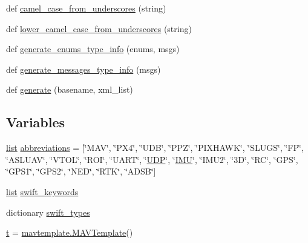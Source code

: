 \begin{DoxyCompactItemize}
\item 
def \mbox{\hyperlink{namespacepymavlink_1_1generator_1_1mavgen__swift_a3be145e5779805512d208e0a874649f5}{camel\+\_\+case\+\_\+from\+\_\+underscores}} (string)
\item 
def \mbox{\hyperlink{namespacepymavlink_1_1generator_1_1mavgen__swift_a760d6a0be86d0a7a913f3294776c9032}{lower\+\_\+camel\+\_\+case\+\_\+from\+\_\+underscores}} (string)
\item 
def \mbox{\hyperlink{namespacepymavlink_1_1generator_1_1mavgen__swift_afb69b33604ef3c1f420f5765fba3a6f3}{generate\+\_\+enums\+\_\+type\+\_\+info}} (enums, msgs)
\item 
def \mbox{\hyperlink{namespacepymavlink_1_1generator_1_1mavgen__swift_ab22d92a382854b7dfe92145f9efc184a}{generate\+\_\+messages\+\_\+type\+\_\+info}} (msgs)
\item 
def \mbox{\hyperlink{namespacepymavlink_1_1generator_1_1mavgen__swift_a0435c038175b5fff7394838ccebd9c64}{generate}} (basename, xml\+\_\+list)
\end{DoxyCompactItemize}
\subsection*{Variables}
\begin{DoxyCompactItemize}
\item 
\mbox{\hyperlink{structlist}{list}} \mbox{\hyperlink{namespacepymavlink_1_1generator_1_1mavgen__swift_a7d48550252b4b1e2355d537407feb187}{abbreviations}} = \mbox{[}\char`\"{}M\+AV\char`\"{}, \char`\"{}P\+X4\char`\"{}, \char`\"{}U\+DB\char`\"{}, \char`\"{}P\+PZ\char`\"{}, \char`\"{}P\+I\+X\+H\+A\+WK\char`\"{}, \char`\"{}S\+L\+U\+GS\char`\"{}, \char`\"{}FP\char`\"{}, \char`\"{}A\+S\+L\+U\+AV\char`\"{}, \char`\"{}V\+T\+OL\char`\"{}, \char`\"{}R\+OI\char`\"{}, \char`\"{}U\+A\+RT\char`\"{}, \char`\"{}\mbox{\hyperlink{classUDP}{U\+DP}}\char`\"{}, \char`\"{}\mbox{\hyperlink{side__camera__transform_8cpp_af4c1686b93c23e8b4b698c82c66845f4}{I\+MU}}\char`\"{}, \char`\"{}I\+M\+U2\char`\"{}, \char`\"{}3\+D\char`\"{}, \char`\"{}\+R\+C\char`\"{}, \char`\"{}\+G\+P\+S\char`\"{}, \char`\"{}\+G\+P\+S1\char`\"{}, \char`\"{}\+G\+P\+S2\char`\"{}, \char`\"{}\+N\+E\+D\char`\"{}, \char`\"{}\+R\+T\+K\char`\"{}, \char`\"{}\+A\+D\+S\+B\char`\"{}\mbox{]}
\item 
\mbox{\hyperlink{structlist}{list}} \mbox{\hyperlink{namespacepymavlink_1_1generator_1_1mavgen__swift_a0de31e1282edfda1429e7a1c9a3412fd}{swift\+\_\+keywords}}
\item 
dictionary \mbox{\hyperlink{namespacepymavlink_1_1generator_1_1mavgen__swift_aacf38ae82237859e3f36b253a9af5a6a}{swift\+\_\+types}}
\item 
\mbox{\hyperlink{namespacepymavlink_1_1generator_1_1mavgen__swift_aac7fb2c7851d03726e4b15fd2304711d}{t}} = \mbox{\hyperlink{classpymavlink_1_1generator_1_1mavtemplate_1_1MAVTemplate}{mavtemplate.\+M\+A\+V\+Template}}()
\end{DoxyCompactItemize}


